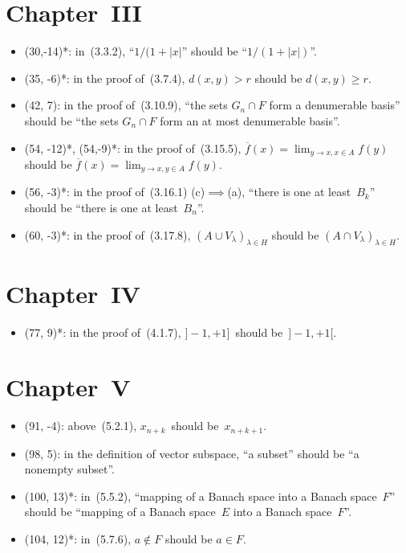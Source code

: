 \documentclass[letterpaper,12pt]{article}
\newcommand{\union}{\cup}
\newcommand{\sect}{\cap}
\newcommand{\abs}[1]{|{#1}|}
\begin{document}
\section*{Chapter~III}
\begin{itemize}
\item (30,-14)*: in~(3.3.2), ``\(1/(1+\abs{x}\)'' should be ``\(1/(1+\abs{x})\)''.
\item (35, -6)*: in the proof of~(3.7.4), \(d(x,y)>r\) should be \(d(x,y)\ge r\).
\item (42, 7): in the proof of~(3.10.9), ``the sets \(G_n\sect F\) form a denumerable basis'' should be ``the sets \(G_n\sect F\) form an at most denumerable basis''.
\item (54, -12)*, (54,-9)*: in the proof of~(3.15.5), \(\overline{f}(x)=\lim_{y\to x,x\in A}f(y)\) should be \(\overline{f}(x)=\lim_{y\to x,y\in A}f(y)\).
\item (56, -3)*: in the proof of~(3.16.1) (c)\(\implies\)(a), ``there is one at least~\(B_k\)'' should be ``there is one at least~\(B_n\)''.
\item (60, -3)*: in the proof of~(3.17.8), \((A\union V_{\lambda})_{\lambda\in H}\) should be \((A\sect V_{\lambda})_{\lambda\in H}\).
\end{itemize}

\section*{Chapter~IV}
\begin{itemize}
\item (77, 9)*: in the proof of~(4.1.7), \(]-1,+1]\)~should be~\(]-1,+1[\).
\end{itemize}

\section*{Chapter~V}
\begin{itemize}
\item (91, -4): above~(5.2.1), \(x_{n+k}\)~should be~\(x_{n+k+1}\).
\item (98, 5): in the definition of vector subspace, ``a subset'' should be ``a nonempty subset''.
\item (100, 13)*: in~(5.5.2), ``mapping of a Banach space into a Banach space~\(F\)'' should be ``mapping of a Banach space~\(E\) into a Banach space~\(F\)''.
\item (104, 12)*: in~(5.7.6), \(a\not\in F\) should be \(a\in F\).
\end{itemize}
\end{document}
